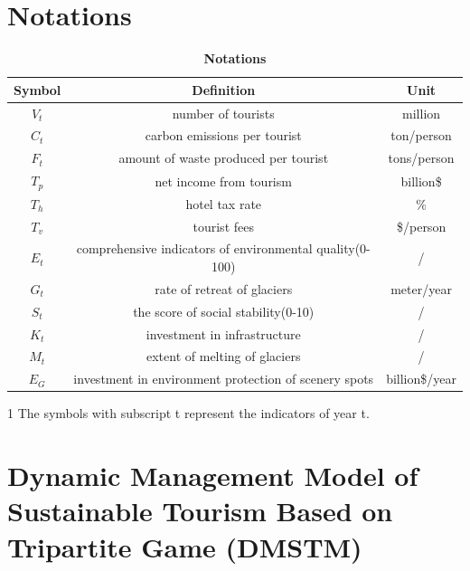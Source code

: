 \documentclass{mcmthesis}
\begin{document}
\section{Notations}
\begin{table}[H]
  \caption{\textbf{Notations}}
  \centering
  \begin{threeparttable}
    \begin{tabular}{ccc}
      \toprule
        Symbol\tnote{1} & Definition & Unit \\
      \midrule
        $V_t$ & number of tourists & million \\ 
        $C_t$ & carbon emissions per tourist & ton/person \\
        $F_t$ & amount of waste produced per tourist & tons/person \\

        $T_p$ & net income from tourism & billion\$ \\
        $T_h$ & hotel tax rate & \% \\
        $T_v$ & tourist fees & \$/person \\

        $E_t$ & comprehensive indicators of environmental quality(0-100) & / \\
        $G_t$ & rate of retreat of glaciers & meter/year \\

        $S_t$ & the score of social stability(0-10) & / \\ 
        $K_t$ & investment in infrastructure & / \\

        $M_t$ & extent of melting of glaciers & / \\
        $E_G$ & investment in environment protection of scenery spots & billion\$/year \\
        \bottomrule
    \end{tabular}
    \begin{tablenotes}
    \footnotesize
      \item[1] The symbols with subscript t represent the indicators of year t.
    \end{tablenotes}
  \end{threeparttable}
\end{table}

\section{Dynamic Management Model of Sustainable Tourism Based on Tripartite Game (DMSTM)}
\end{document}
